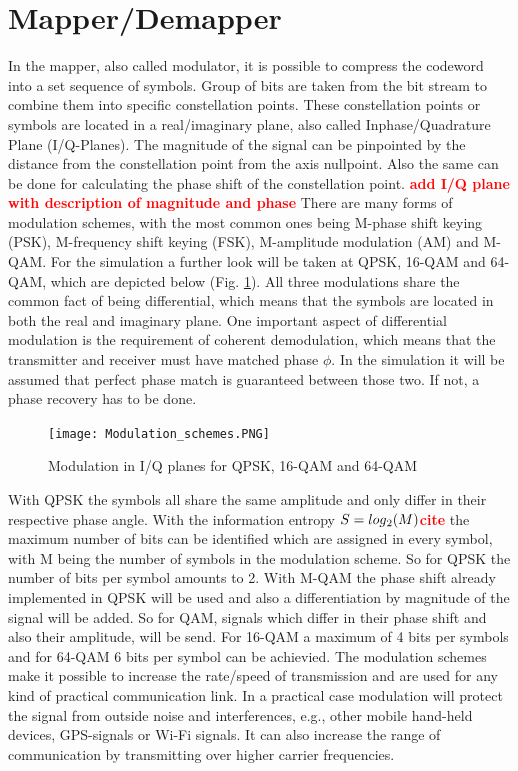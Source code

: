\documentclass[12pt,oneside, draft]{report}
\newcommand\boldred[1]{\textcolor{red}{\textbf{#1}}}
\begin{document}
\section{Mapper/Demapper}
\label{sec:mod}
In the mapper, also called modulator, it is possible to compress the codeword into a set sequence of symbols. Group of bits are taken from the bit stream to combine them into specific constellation points. These constellation points or symbols are located in a real/imaginary plane, also called Inphase/Quadrature Plane (I/Q-Planes). The magnitude of the signal can be pinpointed by the distance from the constellation point from the axis nullpoint. Also the same can be done for calculating the phase shift of the constellation point. 
\newline
\boldred{add I/Q plane with description of magnitude and phase}
\newline
There are many forms of modulation schemes, with the most common ones being M-phase shift keying (PSK), M-frequency shift keying (FSK), M-amplitude modulation (AM) and M-\gls{QAM}. For the simulation a further look will be taken at \gls{QPSK}, 16-\gls{QAM} and 64-\gls{QAM}, which are depicted below (Fig. \ref{fig:Modulation}). All three modulations share the common fact of being differential, which means that the symbols are located in both the real and imaginary plane. One important aspect of differential modulation is the requirement of coherent demodulation, which means that the transmitter and receiver must have matched phase $\phi$. In the simulation it will be assumed that perfect phase match is guaranteed between those two. If not, a phase recovery has to be done.  

\begin{figure}[H]
	\centering
	\texttt{[image: Modulation\_schemes.PNG]}
	\caption{Modulation in I/Q planes for QPSK, 16-QAM and 64-QAM}
	\label{fig:Modulation}
\end{figure}

With \gls{QPSK} the symbols all share the same amplitude and only differ in their respective phase angle. With the information entropy $S = log\textsubscript{2}(M)$\boldred{cite} the maximum number of bits can be identified which are assigned in every symbol, with M being the number of symbols in the modulation scheme. So for \gls{QPSK} the number of bits per symbol amounts to 2.
\newline
With M-\gls{QAM}  the phase shift  already implemented in \gls{QPSK} will be used and also a differentiation by magnitude of the signal will be added. So for \gls{QAM}, signals which differ in their phase shift and also their amplitude, will be send.  For 16-\gls{QAM} a maximum of 4 bits per symbols and for 64-\gls{QAM} 6 bits per symbol can be achievied.
\newline
The modulation schemes make it possible to increase the rate/speed of transmission and are used for any kind of practical communication link. In a practical case modulation will protect the signal from outside noise and interferences, e.g., other mobile hand-held devices, GPS-signals or Wi-Fi signals. It can also increase the range of communication by transmitting over higher carrier frequencies. 
\end{document}
